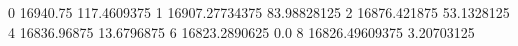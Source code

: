 0 16940.75 117.4609375
1 16907.27734375 83.98828125
2 16876.421875 53.1328125
4 16836.96875 13.6796875
6 16823.2890625 0.0
8 16826.49609375 3.20703125
